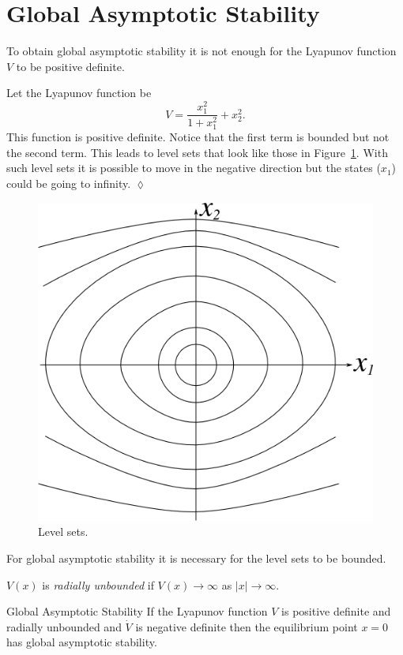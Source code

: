 \mainmatter%
\setcounter{page}{1}

\lectureseries[\course]{\course}

\date{February 4, 2010}

\setaddress%

\setcounter{lecture}{9}
\setcounter{chapter}{9}


\section{Global Asymptotic Stability}
To obtain global asymptotic stability it is not enough for the Lyapunov function $V$ to be positive definite.

\begin{example}
Let the Lyapunov function be
$$V = \frac{x_1^2}{1+x_1^2} + x_2^2.$$
This function is positive definite.
Notice that the first term is bounded but not the second term.
This leads to level sets that look like those in Figure~\ref{fig:10levelSets}.
With such level sets it is possible to move in the negative direction but the states ($x_1$) could be going to infinity.
$\lozenge$
\end{example}

\begin{figure}[ht!]
\centering
\includegraphics[width=.4\textwidth]{images/10levelSets}
\caption{Level sets.}
\label{fig:10levelSets}
\end{figure}

For global asymptotic stability it is necessary for the level sets to be bounded.

\begin{definition}
$V(x)$ is \textit{radially unbounded} if $V(x)\to\infty$ as $|x|\to\infty$.
\end{definition}

\begin{theorem}{Global Asymptotic Stability}
If the Lyapunov function $V$ is positive definite and radially unbounded and $\dot{V}$ is negative definite then the equilibrium point $x=0$ has global asymptotic stability.
\end{theorem}

